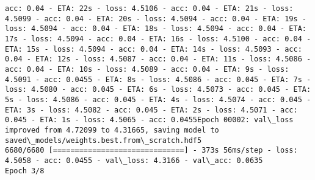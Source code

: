 \documentclass[11pt]{article}
\begin{document}
\begin{Verbatim}[commandchars=\\\{\}]
acc: 0.04 - ETA: 22s - loss: 4.5106 - acc: 0.04 - ETA: 21s - loss: 4.5099 - acc: 0.04 - ETA: 20s - loss: 4.5094 - acc: 0.04 - ETA: 19s - loss: 4.5094 - acc: 0.04 - ETA: 18s - loss: 4.5094 - acc: 0.04 - ETA: 17s - loss: 4.5094 - acc: 0.04 - ETA: 16s - loss: 4.5100 - acc: 0.04 - ETA: 15s - loss: 4.5094 - acc: 0.04 - ETA: 14s - loss: 4.5093 - acc: 0.04 - ETA: 12s - loss: 4.5087 - acc: 0.04 - ETA: 11s - loss: 4.5086 - acc: 0.04 - ETA: 10s - loss: 4.5089 - acc: 0.04 - ETA: 9s - loss: 4.5091 - acc: 0.0455 - ETA: 8s - loss: 4.5086 - acc: 0.045 - ETA: 7s - loss: 4.5080 - acc: 0.045 - ETA: 6s - loss: 4.5073 - acc: 0.045 - ETA: 5s - loss: 4.5086 - acc: 0.045 - ETA: 4s - loss: 4.5074 - acc: 0.045 - ETA: 3s - loss: 4.5082 - acc: 0.045 - ETA: 2s - loss: 4.5071 - acc: 0.045 - ETA: 1s - loss: 4.5065 - acc: 0.0455Epoch 00002: val\_loss improved from 4.72099 to 4.31665, saving model to saved\_models/weights.best.from\_scratch.hdf5
6680/6680 [==============================] - 373s 56ms/step - loss: 4.5058 - acc: 0.0455 - val\_loss: 4.3166 - val\_acc: 0.0635
Epoch 3/8

\end{Verbatim}
\end{document}
